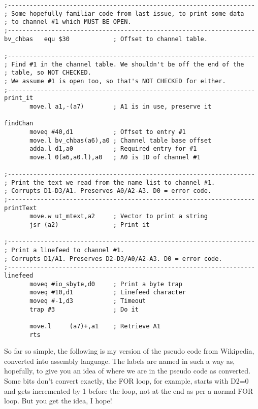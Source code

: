 \begin{lstlisting}[firstnumber=last,caption={Bubblesort Test Harness}]
;--------------------------------------------------------------------
; Some hopefully familiar code from last issue, to print some data
; to channel #1 which MUST BE OPEN.
;--------------------------------------------------------------------
bv_chbas   equ $30            ; Offset to channel table.

;--------------------------------------------------------------------
; Find #1 in the channel table. We shouldn't be off the end of the 
; table, so NOT CHECKED.
; We assume #1 is open too, so that's NOT CHECKED for either.
;--------------------------------------------------------------------
print_it   
       move.l a1,-(a7)        ; A1 is in use, preserve it

findChan   
       moveq #40,d1           ; Offset to entry #1
       move.l bv_chbas(a6),a0 ; Channel table base offset
       adda.l d1,a0           ; Required entry for #1
       move.l 0(a6,a0.l),a0   ; A0 is ID of channel #1

;--------------------------------------------------------------------
; Print the text we read from the name list to channel #1.
; Corrupts D1-D3/A1. Preserves A0/A2-A3. D0 = error code.
;--------------------------------------------------------------------
printText
       move.w ut_mtext,a2     ; Vector to print a string
       jsr (a2)               ; Print it

;--------------------------------------------------------------------
; Print a linefeed to channel #1.
; Corrupts D1/A1. Preserves D2-D3/A0/A2-A3. D0 = error code.
;--------------------------------------------------------------------
linefeed
       moveq #io_sbyte,d0     ; Print a byte trap
       moveq #10,d1           ; Linefeed character
       moveq #-1,d3           ; Timeout
       trap #3                ; Do it
  
       move.l     (a7)+,a1    ; Retrieve A1
       rts
\end{lstlisting}


So far so simple, the following is my version of the pseudo code from Wikipedia, converted into assembly language. The labels are named in such a way as, hopefully, to give you an idea of where we are in the pseudo code as converted. Some bits don't convert exactly, the FOR loop, for example, starts with D2=0 and gets incremented by 1 before the loop, not at the end as per a normal FOR loop. But you get the idea, I hope!

